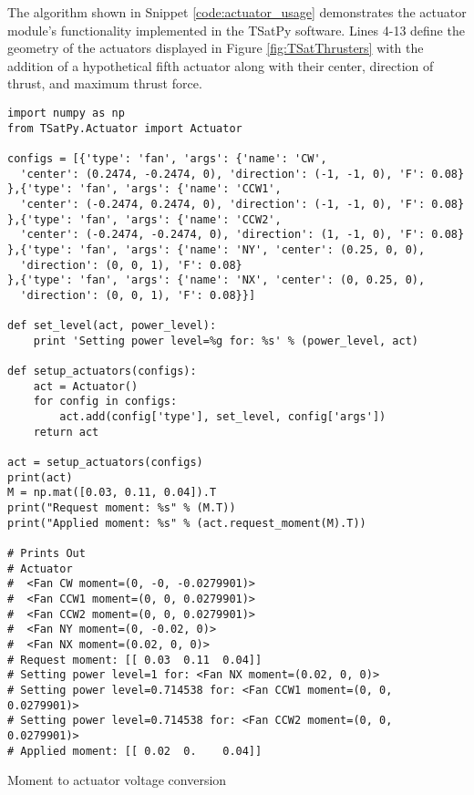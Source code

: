The algorithm shown in Snippet \ref{code:actuator_usage} demonstrates the actuator module's functionality implemented in the TSatPy software.  Lines 4-13 define the geometry of the actuators displayed in Figure \ref{fig:TSatThrusters} with the addition of a hypothetical fifth actuator along with their center, direction of thrust, and maximum thrust force.


\begin{listing}
\begin{singlespace}
  \begin{verbatim}
import numpy as np
from TSatPy.Actuator import Actuator

configs = [{'type': 'fan', 'args': {'name': 'CW',
  'center': (0.2474, -0.2474, 0), 'direction': (-1, -1, 0), 'F': 0.08}
},{'type': 'fan', 'args': {'name': 'CCW1',
  'center': (-0.2474, 0.2474, 0), 'direction': (-1, -1, 0), 'F': 0.08}
},{'type': 'fan', 'args': {'name': 'CCW2',
  'center': (-0.2474, -0.2474, 0), 'direction': (1, -1, 0), 'F': 0.08}
},{'type': 'fan', 'args': {'name': 'NY', 'center': (0.25, 0, 0),
  'direction': (0, 0, 1), 'F': 0.08}
},{'type': 'fan', 'args': {'name': 'NX', 'center': (0, 0.25, 0),
  'direction': (0, 0, 1), 'F': 0.08}}]

def set_level(act, power_level):
    print 'Setting power level=%g for: %s' % (power_level, act)

def setup_actuators(configs):
    act = Actuator()
    for config in configs:
        act.add(config['type'], set_level, config['args'])
    return act

act = setup_actuators(configs)
print(act)
M = np.mat([0.03, 0.11, 0.04]).T
print("Request moment: %s" % (M.T))
print("Applied moment: %s" % (act.request_moment(M).T))

# Prints Out
# Actuator
#  <Fan CW moment=(0, -0, -0.0279901)>
#  <Fan CCW1 moment=(0, 0, 0.0279901)>
#  <Fan CCW2 moment=(0, 0, 0.0279901)>
#  <Fan NY moment=(0, -0.02, 0)>
#  <Fan NX moment=(0.02, 0, 0)>
# Request moment: [[ 0.03  0.11  0.04]]
# Setting power level=1 for: <Fan NX moment=(0.02, 0, 0)>
# Setting power level=0.714538 for: <Fan CCW1 moment=(0, 0, 0.0279901)>
# Setting power level=0.714538 for: <Fan CCW2 moment=(0, 0, 0.0279901)>
# Applied moment: [[ 0.02  0.    0.04]]
  \end{verbatim}
\caption{Moment to actuator voltage conversion}
\label{code:actuator_usage}
\nocite{minted}
\end{singlespace}
\end{listing}

